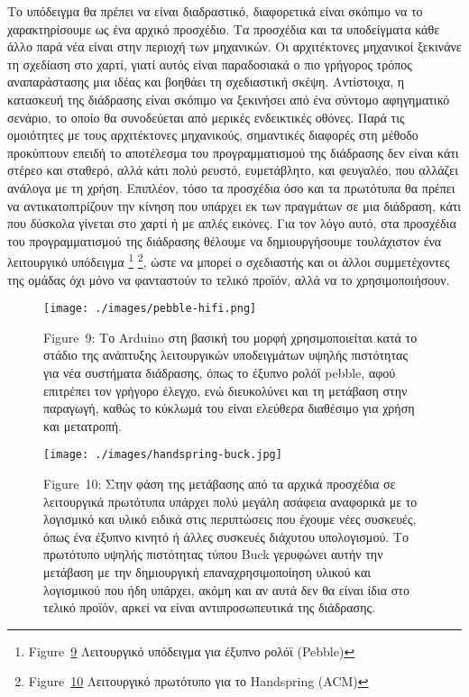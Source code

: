 \documentclass[
]{article}
\begin{document}
Το υπόδειγμα θα πρέπει να είναι διαδραστικό, διαφορετικά είναι σκόπιμο
να το χαρακτηρίσουμε ως ένα αρχικό προσχέδιο. Τα προσχέδια και τα
υποδείγματα κάθε άλλο παρά νέα είναι στην περιοχή των μηχανικών. Οι
αρχιτέκτονες μηχανικοί ξεκινάνε τη σχεδίαση στο χαρτί, γιατί αυτός είναι
παραδοσιακά ο πιο γρήγορος τρόπος αναπαράστασης μια ιδέας και βοηθάει τη
σχεδιαστική σκέψη. Αντίστοιχα, η κατασκευή της διάδρασης είναι σκόπιμο
να ξεκινήσει από ένα σύντομο αφηγηματικό σενάριο, το οποίο θα
συνοδεύεται από μερικές ενδεικτικές οθόνες. Παρά τις ομοιότητες με τους
αρχιτέκτονες μηχανικούς, σημαντικές διαφορές στη μέθοδο προκύπτουν
επειδή το αποτέλεσμα του προγραμματισμού της διάδρασης δεν είναι κάτι
στέρεο και σταθερό, αλλά κάτι πολύ ρευστό, ευμετάβλητο, και φευγαλέο,
που αλλάζει ανάλογα με τη χρήση. Επιπλέον, τόσο τα προσχέδια όσο και τα
πρωτότυπα θα πρέπει να αντικατοπτρίζουν την κίνηση που υπάρχει εκ των
πραγμάτων σε μια διάδραση, κάτι που δύσκολα γίνεται στο χαρτί ή με απλές
εικόνες. Για τον λόγο αυτό, στα προσχέδια του προγραμματισμού της
διάδρασης θέλουμε να δημιουργήσουμε τουλάχιστον ένα λειτουργικό
υπόδειγμα \footnote{Figure~\protect\hyperlink{fig:pebble-hifi}{9}
  Λειτουργικό υπόδειγμα για έξυπνο ρολόϊ (Pebble)} \footnote{Figure~\protect\hyperlink{fig:handspring-buck}{10}
  Λειτουργικό πρωτότυπο για το Handspring (ACM)}, ώστε να μπορεί ο
σχεδιαστής και οι άλλοι συμμετέχοντες της ομάδας όχι μόνο να φανταστούν
το τελικό προϊόν, αλλά να το χρησιμοποιήσουν.

\leavevmode{}%
\begin{figure}
\hypertarget{fig:pebble-hifi}{%
\centering
\texttt{[image: ./images/pebble-hifi.png]}
\caption{Figure~9: Το Arduino στη βασική του μορφή χρησιμοποιείται κατά
το στάδιο της ανάπτυξης λειτουργικών υποδειγμάτων υψηλής πιστότητας για
νέα συστήματα διάδρασης, όπως το έξυπνο ρολόϊ pebble, αφού επιτρέπει τον
γρήγορο έλεγχο, ενώ διευκολύνει και τη μετάβαση στην παραγωγή, καθώς το
κύκλωμά του είναι ελεύθερα διαθέσιμο για χρήση και
μετατροπή.}\label{fig:pebble-hifi}
}
\end{figure}

\leavevmode{}%
\begin{figure}
\hypertarget{fig:handspring-buck}{%
\centering
\texttt{[image: ./images/handspring-buck.jpg]}
\caption{Figure~10: Στην φάση της μετάβασης από τα αρχικά προσχέδια σε
λειτουργικά πρωτότυπα υπάρχει πολύ μεγάλη ασάφεια αναφορικά με το
λογισμικό και υλικό ειδικά στις περιπτώσεις που έχουμε νέες συσκευές,
όπως ένα έξυπνο κινητό ή άλλες συσκευές διάχυτου υπολογισμού. Το
πρωτότυπο υψηλής πιστότητας τύπου Buck γερυφώνει αυτήν την μετάβαση με
την δημιουργική επαναχρησιμοποίηση υλικού και λογισμικού που ήδη
υπάρχει, ακόμη και αν αυτά δεν θα είναι ίδια στο τελικό προϊόν, αρκεί να
είναι αντιπροσωπευτικά της διάδρασης.}\label{fig:handspring-buck}
}
\end{figure}
\end{document}
